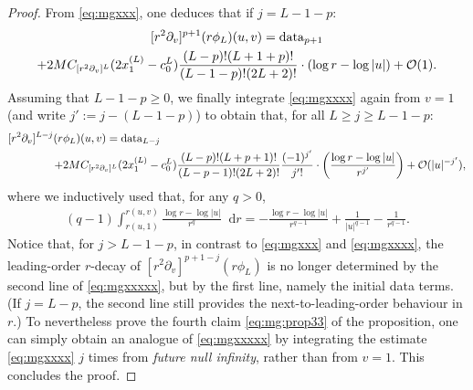 \documentclass[11pt,english]{article}
\numberwithin{equation}{section}
\theoremstyle{remark}
\theoremstyle{plain}
\newenvironment{nalign}{
    \begin{equation}
    \begin{aligned}
}{
    \end{aligned}
    \end{equation}
    \ignorespacesafterend
}
\theoremstyle{remark}
\newcommand{\dd}{\mathop{}\!\mathrm{d}}
\newcommand{\pv}{\partial_v}
\renewcommand{\(}{\left(}
\renewcommand{\)}{\right)}
\begin{document}
\begin{proof}
From \eqref{eq:mgxxx}, one deduces that if $j=L-1-p$:
\begin{multline}\label{eq:mgxxxx}
[r^2\pv]^{p+1}(r\phi_L)(u,v)=\mathrm{data}_{p+1}\\
+2M\cv{L}(2x_1^{(L)}-c_0^L)\frac{(L-p)!(L+1+p)!}{(L-1-p)!(2L+2)!}\cdot (\log r-\log|u|) +\mathcal O(1).%
\end{multline}
Assuming that $L-1-p\geq 0$, we finally integrate \eqref{eq:mgxxxx} again from $v=1$ (and write $j':=j-(L-1-p)$) to obtain that,
for all $L\geq j\geq L-1-p$:
\begin{nalign}\label{eq:mgxxxxx}
[r^2\pv]^{L-j}(r&\phi_L)(u,v)=\mathrm{data}_{L-j}\\
+&2M\cv{L}(2x_1^{(L)}-c_0^L)\frac{(L-p)!(L+p+1)!}{(L-p-1)!(2L+2)!}\frac{(-1)^{j'}}{j'!}\cdot\left(\frac{\log r-\log|u|}{r^{j'}}\right) +\mathcal O(|u|^{-j'}),%
\end{nalign}
where we inductively used that, for any $q>0$,
\begin{align*}
(q-1)\int_{r(u,1)}^{r(u,v)}\frac{\log r-\log |u|}{r^q}\dd r=-\frac{\log r-\log|u|}{r^{q-1}}+\frac{1}{|u|^{q-1}}-\frac{1}{r^{q-1}}.
\end{align*}
Notice that, for $j>L-1-p$, in contrast to \eqref{eq:mgxxx} and \eqref{eq:mgxxxx}, the leading-order $r$-decay of $[r^2\pv]^{p+1-j}(r\phi_L)$ is no longer determined by the second line of \eqref{eq:mgxxxxx}, but by the first line, namely the initial data terms. (If $j=L-p$,  the second line still provides the next-to-leading-order behaviour in $r$.) To nevertheless prove the fourth claim \eqref{eq:mg:prop33} of the proposition, one can simply obtain an analogue of \eqref{eq:mgxxxxx} by integrating the estimate \eqref{eq:mgxxxx} $j$ times from \textit{future null infinity}, rather than from $v=1$. This concludes the proof.
\end{proof}
\end{document}
